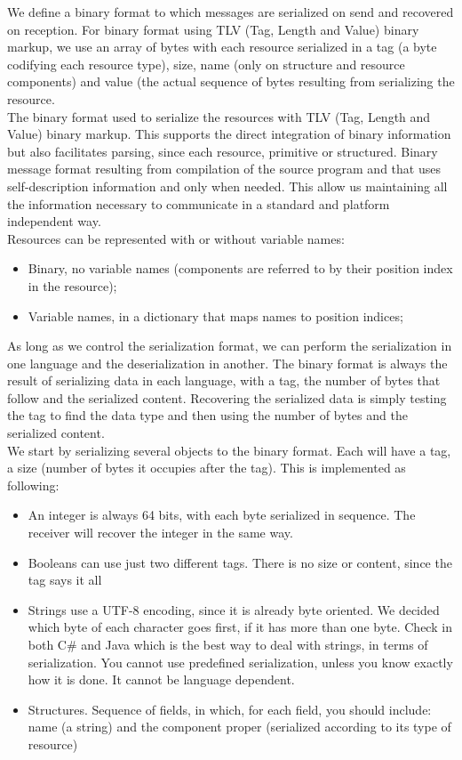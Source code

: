 We define a binary format to which messages are serialized on send and recovered on reception. For binary format using
TLV (Tag, Length and Value) binary markup\citep{asn1:opt}, we use an array of bytes with each resource serialized in a tag (a byte
codifying each resource type), size, name (only on structure and resource components) and value (the actual sequence
of bytes resulting from serializing the resource.\\

The binary format used to serialize the resources with TLV (Tag, Length and Value) binary markup. This supports the
direct integration of binary information but also facilitates parsing, since each resource, primitive or structured.
Binary message format resulting from compilation of the source program and that uses self-description information and
only when needed. This allow us maintaining all the information necessary to communicate in a standard and platform
independent way.\\

Resources can be represented with or without variable names: 
\begin{itemize}
\item Binary, no variable names (components are referred to by their position index in the resource); 
\item Variable names, in a dictionary that maps names to position indices; 
\end{itemize}

As long as we control the serialization format, we can perform the serialization in one language and the
deserialization in another. The binary format is always the result of serializing data in each language, with a tag,
the number of bytes that follow and the serialized content. Recovering the serialized data is simply testing the tag
to find the data type and then using the number of bytes and the serialized content.\\

We start by serializing several objects to the binary format. Each will have a tag, a size (number of bytes it occupies after
the tag). This is implemented as following:

\begin{itemize}

\item 	An integer is always 64 bits, with each byte serialized in sequence. The receiver will recover the integer in the
same way.
\item 	Booleans can use just two different tags. There is no size or content, since the tag says it all
\item 	Strings use a UTF-8 encoding, since it is already byte oriented. We decided which byte of each character goes first, if it has more than one byte.
Check in both C\# and Java which is the best way to deal with strings, in terms of serialization.
You cannot use predefined serialization, unless you know exactly how it is done. It cannot be language dependent.
\item 	Structures. Sequence of fields, in which, for each field, you should include: name (a string) and the component proper (serialized according to its type of resource)
\end{itemize}

